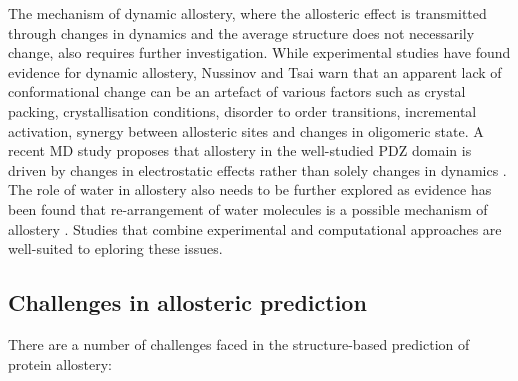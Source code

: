 The mechanism of dynamic allostery, where the allosteric effect is transmitted through changes in dynamics and the average structure does not necessarily change, also requires further investigation.
While experimental studies \cite{Popovych2006, Capdevila2017, Wellington2017} have found evidence for dynamic allostery, Nussinov and Tsai \cite{Nussinov2015} warn that an apparent lack of conformational change can be an artefact of various factors such as crystal packing, crystallisation conditions, disorder to order transitions, incremental activation, synergy between allosteric sites and changes in oligomeric state.
A recent MD study proposes that allostery in the well-studied PDZ domain is driven by changes in electrostatic effects rather than solely changes in dynamics \cite{Kumawat2017, Liu2017}.
The role of water in allostery also needs to be further explored as evidence has been found that re-arrangement of water molecules is a possible mechanism of allostery \cite{Buchli2013, Amor2016}.
Studies that combine experimental and computational approaches \cite{Haselbach2017, Ozorowski2017} are well-suited to eploring these issues.


\subsection{Challenges in allosteric prediction}

There are a number of challenges faced in the structure-based prediction of protein allostery:

